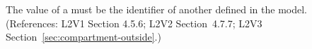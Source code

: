 The   value of a \Compartment must be the identifier of
another \Compartment defined in the model.  (References: L2V1 Section
4.5.6; L2V2 Section~4.7.7; L2V3 Section~\ref{sec:compartment-outside}.)
